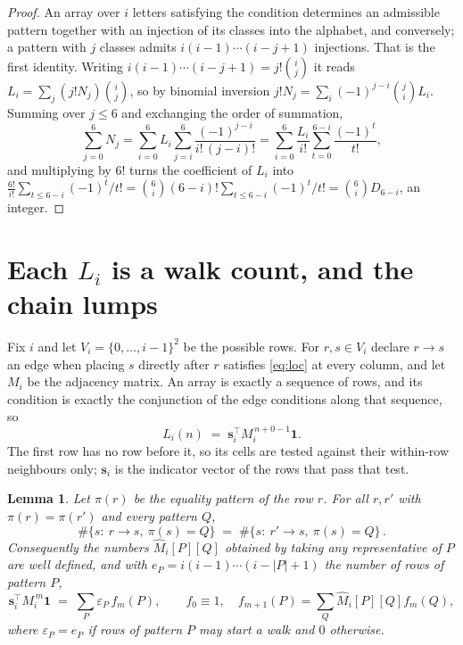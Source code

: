 \documentclass[11pt,a4paper]{article}
\theoremstyle{plain}
\newtheorem{lemma}[theorem]{Lemma}
\theoremstyle{definition}
\begin{document}
\begin{proof}
An array over $i$ letters satisfying the condition determines an admissible pattern together
with an injection of its classes into the alphabet, and conversely; a pattern with $j$
classes admits $i(i-1)\cdots(i-j+1)$ injections. That is the first identity. Writing
$i(i-1)\cdots(i-j+1)=j!\binom{i}{j}$ it reads $L_i=\sum_j (j!N_j)\binom{i}{j}$, so by
binomial inversion $j!N_j=\sum_{i}(-1)^{j-i}\binom{j}{i}L_i$. Summing over
$j\le 6$ and exchanging the order of summation,
\[
\sum_{j=0}^{6}N_j=\sum_{i=0}^{6}L_i\sum_{j=i}^{6}\frac{(-1)^{j-i}}{i!\,(j-i)!}
=\sum_{i=0}^{6}\frac{L_i}{i!}\sum_{t=0}^{6-i}\frac{(-1)^t}{t!} ,
\]
and multiplying by $6!$ turns the coefficient of $L_i$ into
$\frac{6!}{i!}\sum_{t\le 6-i}(-1)^t/t!=\binom{6}{i}(6-i)!\sum_{t\le 6-i}(-1)^t/t!
=\binom{6}{i}D_{6-i}$, an integer.
\end{proof}

\section{Each $L_i$ is a walk count, and the chain lumps}

Fix $i$ and let $V_i=\{0,\dots,i-1\}^{2}$ be the possible rows. For $r,s\in V_i$
declare $r\to s$ an edge when placing $s$ directly after $r$ satisfies \eqref{eq:loc} at
every column, and let $M_i$ be the adjacency matrix. An array is exactly a sequence of
rows, and its condition is exactly the conjunction of the edge conditions along that
sequence, so
\[
L_i(n)\;=\;\mathbf{s}_i^{\!\top}M_i^{\,n+0-1}\mathbf{1} .
\]
The first row has no row before it, so its cells are tested
against their within-row neighbours only; $\mathbf{s}_i$ is the indicator vector of the
rows that pass that test.

\begin{lemma}\label{lem:lump}
Let $\pi(r)$ be the equality pattern of the row $r$. For all $r,r'$ with
$\pi(r)=\pi(r')$ and every pattern $Q$,
\[
\#\{s:\ r\to s,\ \pi(s)=Q\}\;=\;\#\{s:\ r'\to s,\ \pi(s)=Q\}\, .
\]
Consequently the numbers $\widehat M_i[P][Q]$ obtained by taking any representative of $P$
are well defined, and with $e_P=i(i-1)\cdots(i-|P|+1)$ the number of rows of pattern $P$,
\[
\mathbf{s}_i^{\!\top}M_i^{\,m}\mathbf{1}\;=\;\sum_P \varepsilon_P\,f_m(P),
\qquad f_0\equiv1,\quad f_{m+1}(P)=\sum_Q\widehat M_i[P][Q]f_m(Q),
\]
where $\varepsilon_P=e_P$ if rows of pattern $P$ may start a walk and $0$ otherwise.
\end{lemma}
\end{document}
